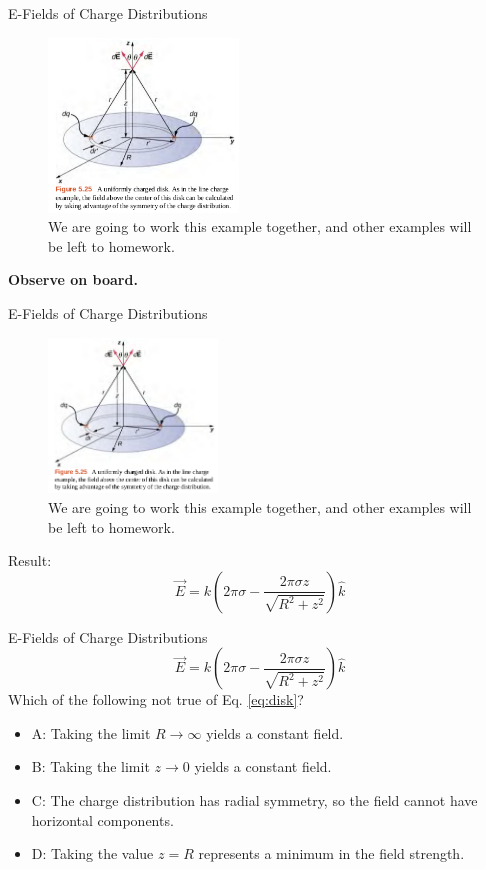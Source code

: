 \documentclass{beamer}
\begin{document}
\begin{frame}{E-Fields of Charge Distributions}
\begin{figure}
\includegraphics[width=0.45\textwidth]{figures/disk.png}
\caption{\label{fig:disk} We are going to work this example together, and other examples will be left to homework.}
\end{figure}
\textbf{Observe on board.}
\end{frame}

\begin{frame}{E-Fields of Charge Distributions}
\begin{figure}
\includegraphics[width=0.4\textwidth]{figures/disk.png}
\caption{\label{fig:disk2} We are going to work this example together, and other examples will be left to homework.}
\end{figure}
Result:
\begin{equation}
\boxed{
\vec{E} = k\left(2\pi\sigma - \frac{2\pi\sigma z}{\sqrt{R^2 + z^2}} \right)\hat{k}}
\end{equation}
\end{frame}

\begin{frame}{E-Fields of Charge Distributions}
\begin{equation}
\boxed{
\vec{E} = k\left(2\pi\sigma - \frac{2\pi\sigma z}{\sqrt{R^2 + z^2}} \right)\hat{k}} \label{eq:disk}
\end{equation}
Which of the following not true of Eq. \ref{eq:disk}?
\begin{itemize}
\item A: Taking the limit $R \rightarrow \infty$ yields a constant field.
\item B: Taking the limit $z \rightarrow 0$ yields a constant field.
\item C: The charge distribution has radial symmetry, so the field cannot have horizontal components.
\item D: Taking the value $z = R$ represents a minimum in the field strength.
\end{itemize}
\end{frame}
\end{document}
